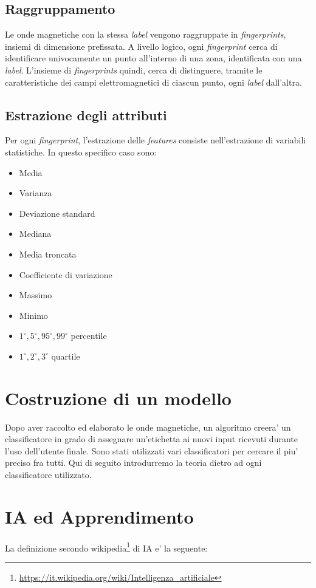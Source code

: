 \subsection*{Raggruppamento}
Le onde magnetiche con la stessa \textit{label} vengono raggruppate in \textit{fingerprints}, insiemi di dimensione prefissata. A livello logico, ogni \textit{fingerprint} cerca di identificare univocamente un punto all'interno di una zona, identificata con una \textit{label}. L'insieme di \textit{fingerprints} quindi, cerca di distinguere, tramite le caratteristiche dei campi elettromagnetici di ciascun punto, ogni \textit{label} dall'altra.

\subsection*{Estrazione degli attributi}
Per ogni \textit{fingerprint}, l'estrazione delle \textit{features} consiste nell'estrazione di variabili statistiche. In questo specifico caso sono:
\begin{itemize}
	\item Media
	\item Varianza
	\item Deviazione standard
	\item Mediana
	\item Media troncata
	\item Coefficiente di variazione
	\item Massimo
	\item Minimo
	\item $ 1^{\circ}, 5^{\circ}, 95^{\circ}, 99^{\circ} $ percentile
	\item $ 1^{\circ}, 2^{\circ}, 3^{\circ} $ quartile
\end{itemize}





\section*{Costruzione di un modello}

Dopo aver raccolto ed elaborato le onde magnetiche, un algoritmo creera' un classificatore in grado di assegnare un'etichetta ai nuovi input ricevuti durante l'uso dell'utente finale.
Sono stati utilizzati vari classificatori per cercare il piu' preciso fra tutti. Qui di seguito introdurremo la teoria dietro ad ogni classificatore utilizzato.
\newpage
\section*{IA ed Apprendimento}
La definizione secondo wikipedia\footnote{\url{https://it.wikipedia.org/wiki/Intelligenza_artificiale}} di IA e' la seguente:\\

